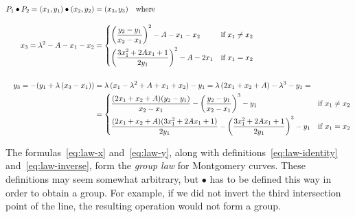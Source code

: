 \documentclass{article}
\begin{document}
\begin{align}
P_1 \bullet P_2 = (x_1, y_1) \bullet (x_2, y_2) &= (x_3, y_3) \quad\text{where}\nonumber\\[10pt]
x_3 = \lambda^2 - A - x_1 - x_2 &= \begin{dcases}
\left(\frac{y_2 - y_1}{x_2 - x_1}\right)^2 - A - x_1 - x_2 & \text{if } x_1 \neq x_2 \\
\left(\frac{3x_1^2 + 2Ax_1 + 1}{2y_1}\right)^2 - A - 2x_1 & \text{if } x_1 = x_2
\end{dcases}\label{eq:law-x}\\[15pt]
y_3 = -(y_1 + \lambda\,(x_3 - x_1)) &= \lambda\,(x_1 - \lambda^2 + A + x_1 + x_2) - y_1 =
\lambda\,(2x_1 + x_2 + A) - \lambda^3 - y_1 =\label{eq:law-y}\\
&= \begin{dcases}
\frac{(2x_1 + x_2 + A) (y_2 - y_1)}{x_2 - x_1} - \left(\frac{y_2 - y_1}{x_2 - x_1}\right)^3 - y_1 & \text{if } x_1 \neq x_2 \\
\frac{(2x_1 + x_2 + A) (3x_1^2 + 2Ax_1 + 1)}{2y_1} - \left(\frac{3x_1^2 + 2Ax_1 + 1}{2y_1}\right)^3 - y_1 & \text{if } x_1 = x_2
\end{dcases}\nonumber
\end{align}

The formulas~\eqref{eq:law-x} and~\eqref{eq:law-y}, along with definitions~\eqref{eq:law-identity} and~\eqref{eq:law-inverse}, form the \emph{group law} for Montgomery curves.
These definitions may seem somewhat arbitrary, but $\bullet$ has to be defined this way in order to obtain a group.
For example, if we did not invert the third intersection point of the line, the resulting operation would not form a group.
\end{document}
